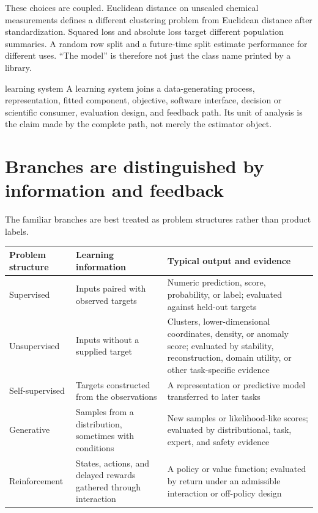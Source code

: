These choices are coupled. Euclidean distance on unscaled chemical
measurements defines a different clustering problem from Euclidean distance
after standardization. Squared loss and absolute loss target different
population summaries. A random row split and a future-time split estimate
performance for different uses. ``The model'' is therefore not just the class
name printed by a library.

\begin{definitionbox}{learning system}
A learning system joins a data-generating process, representation, fitted
component, objective, software interface, decision or scientific consumer,
evaluation design, and feedback path. Its unit of analysis is the claim made by
the complete path, not merely the estimator object.
\end{definitionbox}

\section{Branches are distinguished by information and feedback}

The familiar branches are best treated as problem structures rather than
product labels.

\begin{tabularx}{\textwidth}{@{}p{}p{}X@{}}
\toprule
Problem structure & Learning information & Typical output and evidence \\
\midrule
Supervised & Inputs paired with observed targets & Numeric prediction, score,
probability, or label; evaluated against held-out targets \\
Unsupervised & Inputs without a supplied target & Clusters, lower-dimensional
coordinates, density, or anomaly score; evaluated by stability, reconstruction,
domain utility, or other task-specific evidence \\
Self-supervised & Targets constructed from the observations & A representation
or predictive model transferred to later tasks \\
Generative & Samples from a distribution, sometimes with conditions & New
samples or likelihood-like scores; evaluated by distributional, task, expert,
and safety evidence \\
Reinforcement & States, actions, and delayed rewards gathered through
interaction & A policy or value function; evaluated by return under an
admissible interaction or off-policy design \\
\bottomrule
\end{tabularx}

